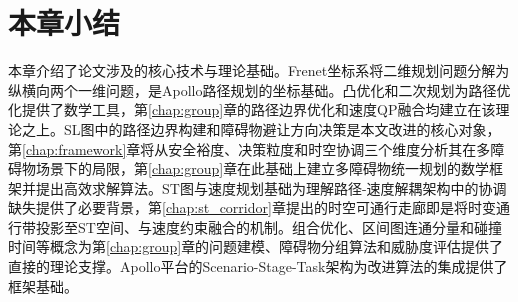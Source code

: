 \section{本章小结}

本章介绍了论文涉及的核心技术与理论基础。Frenet坐标系将二维规划问题分解为纵横向两个一维问题，是Apollo路径规划的坐标基础。凸优化和二次规划为路径优化提供了数学工具，第\ref{chap:group}章的路径边界优化和速度QP融合均建立在该理论之上。SL图中的路径边界构建和障碍物避让方向决策是本文改进的核心对象，第\ref{chap:framework}章将从安全裕度、决策粒度和时空协调三个维度分析其在多障碍物场景下的局限，第\ref{chap:group}章在此基础上建立多障碍物统一规划的数学框架并提出高效求解算法。ST图与速度规划基础为理解路径-速度解耦架构中的协调缺失提供了必要背景，第\ref{chap:st_corridor}章提出的时空可通行走廊即是将时变通行带投影至ST空间、与速度约束融合的机制。组合优化、区间图连通分量和碰撞时间等概念为第\ref{chap:group}章的问题建模、障碍物分组算法和威胁度评估提供了直接的理论支撑。Apollo平台的Scenario-Stage-Task架构为改进算法的集成提供了框架基础。
